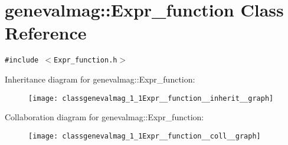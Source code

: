 \hypertarget{classgenevalmag_1_1Expr__function}{
\section{genevalmag::Expr\_\-function Class Reference}
\label{classgenevalmag_1_1Expr__function}
}
{\tt \#include $<$Expr\_\-function.h$>$}

Inheritance diagram for genevalmag::Expr\_\-function:\nopagebreak
\begin{figure}[H]
\begin{center}
\leavevmode
\texttt{[image: classgenevalmag\_1\_1Expr\_\_function\_\_inherit\_\_graph]}
\end{center}
\end{figure}
Collaboration diagram for genevalmag::Expr\_\-function:\nopagebreak
\begin{figure}[H]
\begin{center}
\leavevmode
\texttt{[image: classgenevalmag\_1\_1Expr\_\_function\_\_coll\_\_graph]}
\end{center}
\end{figure}
